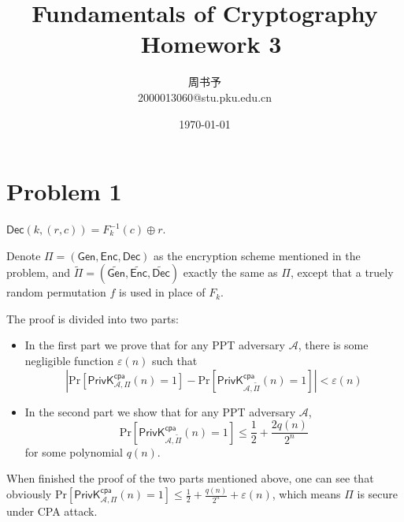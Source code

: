 \documentclass[8pt]{article}
\title{\heiti\zihao{1} Fundamentals  of Cryptography \ Homework 3}
\author{\kaishu\zihao{-3} 周书予\\2000013060@stu.pku.edu.cn}
\date{\today}
\theoremstyle{compact}
\def\le{\leqslant}
\begin{document}
\large
{}
\pagestyle{plain}



\maketitle

\def\PrivK#1#2{\textsf{PrivK}_{{#1}}^{\textsf{#2}}}

\section*{Problem 1}

$\textsf{Dec}(k, (r, c)) = F_k^{-1}(c) \oplus r$.

Denote $\Pi = (\textsf{Gen}, \textsf{Enc}, \textsf{Dec})$ as the encryption scheme mentioned in the problem, and $\tilde{\Pi} = (\widetilde{\textsf{Gen}}, \widetilde{\textsf{Enc}}, \widetilde{\textsf{Dec}})$ exactly the same as $\Pi$, except that a truely random permutation $f$ is used in place of $F_k$.

The proof is divided into two parts: \begin{itemize}
	\item In the first part we prove that for any PPT adversary $\mathcal A$, there is some negligible function $\varepsilon(n)$ such that \begin{equation}\left| \text{Pr}\left[\PrivK{\mathcal A, \Pi}{cpa}(n) = 1\right] - \text{Pr}\left[\PrivK{\mathcal A, \tilde{\Pi}}{cpa}(n) = 1\right] \right| < \varepsilon(n)\label{1-1}\end{equation}
	\item In the second part we show that for any PPT adversary $\mathcal A$, \begin{equation}\text{Pr}\left[\PrivK{\mathcal A, \tilde{\Pi}}{cpa}(n) = 1\right] \le \frac12 + \frac{2q(n)}{2^n}\label{1-2}\end{equation} for some polynomial $q(n)$.
\end{itemize}

When finished the proof of the two parts mentioned above, one can see that obviously $\text{Pr}\left[\PrivK{\mathcal A, \Pi}{cpa}(n) = 1\right] \le \frac12 + \frac{q(n)}{2^n} + \varepsilon(n)$, which means $\Pi$ is secure under CPA attack.
\end{document}
